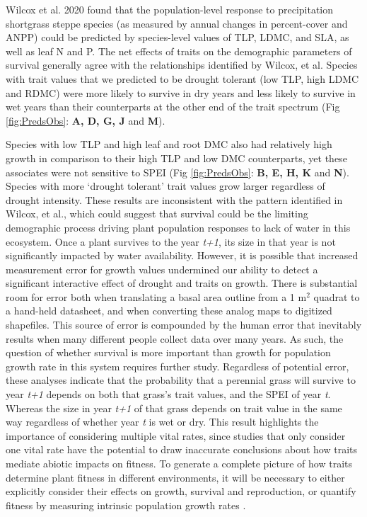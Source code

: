 \documentclass[12pt, letterpaper]{article}
\begin{document}
Wilcox et al. 2020 found that the population-level response to precipitation shortgrass steppe species (as measured by annual changes in percent-cover and ANPP) could be predicted by species-level values of TLP, LDMC, and SLA, as well as leaf N and P. The net effects of traits on the demographic parameters of survival generally agree with the relationships identified by Wilcox, et al. Species with trait values that we predicted to be drought tolerant (low TLP, high LDMC and RDMC) were more likely to survive in dry years and less likely to survive in wet years than their counterparts at the other end of the trait spectrum (Fig \ref{fig:PredsObs}: \textbf{A, D, G, J} and \textbf{M}).

Species with low TLP and high leaf and root DMC also had relatively high growth in comparison to their high TLP and low DMC counterparts, yet these associates were not sensitive to SPEI (Fig \ref{fig:PredsObs}: \textbf{B, E, H, K} and \textbf{N}). Species with more ‘drought tolerant’ trait values grow larger regardless of drought intensity. These results are inconsistent with the pattern identified in Wilcox, et al., which could suggest that survival could be the limiting demographic process driving plant population responses to lack of water in this ecosystem. Once a plant survives to the year \textit{t+1}, its size in that year is not significantly impacted by water availability. However, it is possible that increased measurement error for growth values undermined our ability to detect a significant interactive effect of drought and traits on growth. There is substantial room for error both when translating a basal area outline from a 1 m$^2$ quadrat to a hand-held datasheet, and when converting these analog maps to digitized shapefiles. This source of error is compounded by the human error that inevitably results when many different people collect data over many years. As such, the question of whether survival is more important than growth for population growth rate in this system requires further study. Regardless of potential error, these analyses indicate that the probability that a perennial grass will survive to year \textit{t+1} depends on both that grass’s trait values, and the SPEI of year \textit{t}. Whereas the size in year \textit{t+1} of that grass depends on trait value in the same way regardless of whether year \textit{t} is wet or dry. This result highlights the importance of considering multiple vital rates, since studies that only consider one vital rate have the potential to draw inaccurate conclusions about how traits mediate abiotic impacts on fitness. To generate a complete picture of how traits determine plant fitness in different environments, it will be necessary to either explicitly consider their effects on growth, survival and reproduction, or quantify fitness by measuring intrinsic population growth rates \citep{Laughlin2020TheFitness}.
\end{document}
